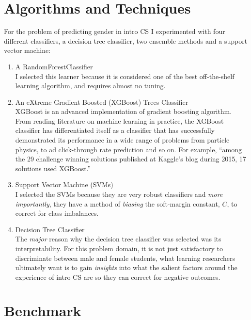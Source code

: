 \section*{Algorithms and Techniques}

For the problem of predicting gender in intro CS I experimented with four different classifiers, a decision tree classifier, two ensemble methods and a support vector machine:

\begin{enumerate}%
\item A RandomForestClassifier\\
I selected this learner because it is considered one of the best off-the-shelf learning algorithm, and requires almost no tuning. 
\item An eXtreme Gradient Boosted (XGBoost) Trees Classifier\\
XGBoost is an advanced implementation of gradient boosting algorithm. From reading literature on machine learning in practice, the XGBoost classifier has differentiated itself as a classifier that has successfully demonstrated its performance in a wide range of problems from particle physics, to ad click-through rate prediction and so on. For example, ``among the 29 challenge winning solutions published at Kaggle's blog during 2015, 17 solutions used XGBoost.''

\item Support Vector Machine (SVMs)\\
I selected the SVMs because they are very robust classifiers and \textit{more importantly}, they have a method of \textit{biasing} the soft-margin constant, $C$, to correct for class imbalances. 
              
\item Decision Tree Classifier\\
The \textit{major} reason why the decision tree classifier was selected was its interpretability. For this problem domain, it is not just satisfactory to discriminate between male and female students, what learning researchers ultimately want is to gain \textit{insights} into what the salient factors around the experience of intro CS are so they can correct for negative outcomes.

\end{enumerate}

\section*{Benchmark}

